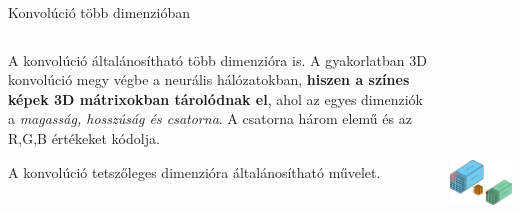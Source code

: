 \documentclass[english, aspectratio=169]{beamer}
\begin{document}
\begin{frame}{Konvolúció több dimenzióban}
\begin{columns}
\begin{column}{.5\textwidth}
A konvolúció általánosítható több dimenzióra is. A gyakorlatban 3D konvolúció megy végbe a neurális hálózatokban, \textbf{hiszen a színes képek 3D mátrixokban tárolódnak el}, ahol az egyes dimenziók a \emph{magasság, hosszúság és csatorna}. A csatorna három elemű és az R,G,B értékeket kódolja.\par\smallskip
A konvolúció tetszőleges dimenzióra általánosítható művelet.
\end{column}
\begin{column}{.5\textwidth}
\begin{center}
\includegraphics[height=7cm, width=7cm, keepaspectratio]{images/dl_5.png}
\end{center}
\end{column}
\end{columns}
\end{frame}
\end{document}
